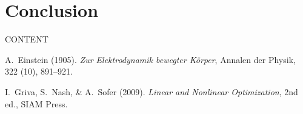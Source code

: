 \documentclass[12pt]{amsart}
\begin{document}
\section{Conclusion}  CONTENT

\begin{thebibliography}{2}  %
A.~Einstein (1905). 
\textit{Zur Elektrodynamik bewegter K{\"o}rper},
Annalen der Physik, 322 (10), 891--921.

I.~Griva, S.~Nash, \& A.~Sofer (2009).
\textit{Linear and Nonlinear Optimization},
2nd ed., SIAM Press.
\end{thebibliography}
\end{document}
